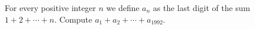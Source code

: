 For every positive integer $n$ we define $a_{n}$ as the last digit of the sum $1+2+\cdots+n$. Compute $a_{1}+a_{2}+\cdots+a_{1992}$.